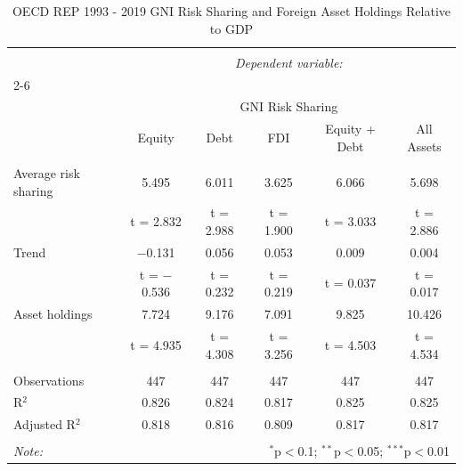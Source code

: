 
\begin{table}[!htbp] \centering 
  \caption{OECD REP 1993 - 2019 GNI Risk Sharing and Foreign Asset Holdings Relative to GDP} 
  \label{} 
\begin{tabular}{@{\extracolsep{5pt}}lccccc} 
\\[-1.8ex]\hline 
\hline \\[-1.8ex] 
 & \multicolumn{5}{c}{\textit{Dependent variable:}} \\ 
\cline{2-6} 
\\[-1.8ex] & \multicolumn{5}{c}{GNI Risk Sharing} \\ 
 & Equity & Debt & FDI & Equity + Debt & All Assets \\ 
\hline \\[-1.8ex] 
 Average risk sharing & 5.495 & 6.011 & 3.625 & 6.066 & 5.698 \\ 
  & t = 2.832 & t = 2.988 & t = 1.900 & t = 3.033 & t = 2.886 \\ 
  Trend & $-$0.131 & 0.056 & 0.053 & 0.009 & 0.004 \\ 
  & t = $-$0.536 & t = 0.232 & t = 0.219 & t = 0.037 & t = 0.017 \\ 
  Asset holdings & 7.724 & 9.176 & 7.091 & 9.825 & 10.426 \\ 
  & t = 4.935 & t = 4.308 & t = 3.256 & t = 4.503 & t = 4.534 \\ 
 \hline \\[-1.8ex] 
Observations & 447 & 447 & 447 & 447 & 447 \\ 
R$^{2}$ & 0.826 & 0.824 & 0.817 & 0.825 & 0.825 \\ 
Adjusted R$^{2}$ & 0.818 & 0.816 & 0.809 & 0.817 & 0.817 \\ 
\hline 
\hline \\[-1.8ex] 
\textit{Note:}  & \multicolumn{5}{r}{$^{*}$p$<$0.1; $^{**}$p$<$0.05; $^{***}$p$<$0.01} \\ 
\end{tabular} 
\end{table} 
